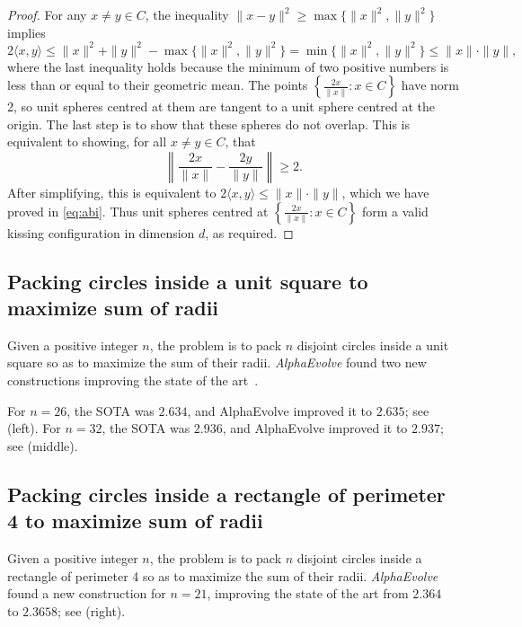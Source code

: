 \documentclass[logo,copyright,12pt]{googledeepmind}
\theoremstyle{definition}
\theoremstyle{remark}
\theoremstyle{plain}
\newcommand{\method}{\emph{AlphaEvolve}\xspace}
\begin{document}
\begin{proof}
For any $x\neq y \in C$, the inequality $\|x - y\|^2 \geq \max \{\|x\|^2, \|y\|^2\}$ implies
\begin{equation}
2 \langle x, y \rangle \leq \|x\|^2 + \|y\|^2 - \max \{\|x\|^2, \|y\|^2\} = \min \{\|x\|^2, \|y\|^2\} \leq \|x\|\cdot\|y\|,
\label{eq:abi}
\end{equation}
where the last inequality holds because the minimum of two positive numbers is less than or equal to their geometric mean.
The points $\left\{ \frac{2x}{\|x\|}:{x\in C}\right\}$ have norm 2, so unit spheres centred at them are tangent to a unit sphere centred at the origin.
The last step is to show that these spheres do not overlap. This is equivalent to showing, for all $x\neq y \in C$, that
\[
\left\| \frac{2x}{\|x\|} -  \frac{2y}{\|y\|}\right\| \geq 2.
\]
After simplifying, this is equivalent to
\(
2 \langle x, y \rangle  \leq \|x\|\cdot\|y\|\),
which we have proved in \eqref{eq:abi}.
Thus unit spheres centred at $\left\{ \frac{2x}{\|x\|}:{x\in C}\right\}$ form a valid kissing configuration in dimension $d$, as required.
\end{proof}


\subsection{Packing circles inside a unit square to maximize sum of radii}

Given a positive integer $n$, the problem is to pack $n$ disjoint circles inside a unit square so as to maximize the sum of their radii. \method found two new constructions improving the state of the art~\citep{geometry_collection}.

For $n=26$, the SOTA was $2.634$, and AlphaEvolve improved it to $2.635$; see  (left).
For $n=32$, the SOTA was $2.936$, and AlphaEvolve improved it to $2.937$; see  (middle).

\subsection{Packing  circles inside a rectangle of perimeter 4 to maximize sum of radii}
Given a positive integer $n$, the problem is to pack $n$ disjoint circles inside a rectangle of perimeter 4 so as to maximize the sum of their radii. 
\method found a new construction for $n=21$, improving the state of the art from $2.364$~\citep{geometry_collection} to $2.3658$; see  (right).
\end{document}
